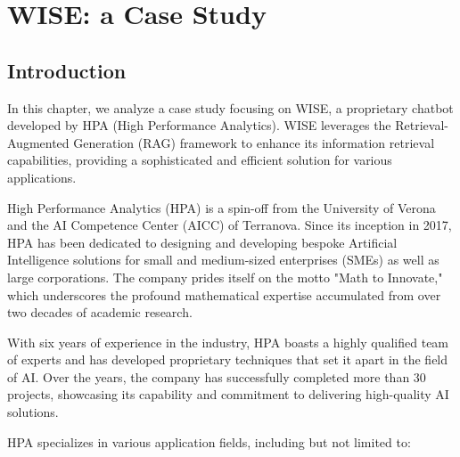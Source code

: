 \section{WISE: a Case Study}

\subsection{Introduction}

In this chapter, we analyze a case study focusing on WISE, a proprietary chatbot developed by HPA (High Performance Analytics). WISE leverages the Retrieval-Augmented Generation (RAG) framework to enhance its information retrieval capabilities, providing a sophisticated and efficient solution for various applications.

High Performance Analytics (HPA) is a spin-off from the University of Verona and the AI Competence Center (AICC) of Terranova. Since its inception in 2017, HPA has been dedicated to designing and developing bespoke Artificial Intelligence solutions for small and medium-sized enterprises (SMEs) as well as large corporations. The company prides itself on the motto "Math to Innovate," which underscores the profound mathematical expertise accumulated from over two decades of academic research.

With six years of experience in the industry, HPA boasts a highly qualified team of experts and has developed proprietary techniques that set it apart in the field of AI. Over the years, the company has successfully completed more than 30 projects, showcasing its capability and commitment to delivering high-quality AI solutions.

HPA specializes in various application fields, including but not limited to:

